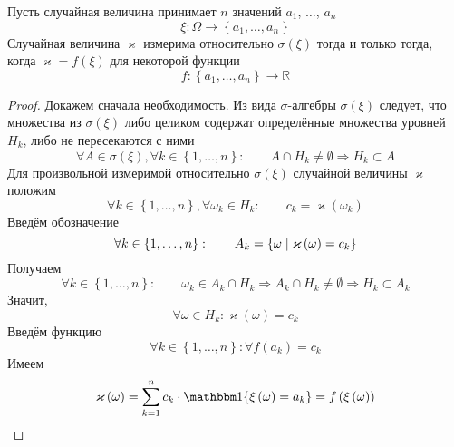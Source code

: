 \begin{affirmation}\label{measurableRandomVariable}
  Пусть случайная величина принимает $n$ значений $a_1$, $\dots$, $a_n$
  \begin{equation*}
    \xi: \Omega \rightarrow \left\{ a_1, \dots, a_n \right\}
  \end{equation*}
  Случайная величина $\varkappa$ измерима относительно
  $\sigma\left( \xi \right)$ тогда и только тогда, когда
  $\varkappa = f\left( \xi \right)$ для некоторой функции
  \begin{equation*}
    f: \left\{ a_1, \dots, a_n \right\} \rightarrow \mathbb{R}
  \end{equation*}
\end{affirmation}
\begin{proof}
  Докажем сначала необходимость.
  Из вида $\sigma$-алгебры $\sigma\left( \xi \right)$ следует, что множества
  из $\sigma\left( \xi \right)$ либо целиком содержат определённые множества
  уровней $H_k$, либо не пересекаются с ними
  \begin{equation*}
    \forall A \in \sigma\left( \xi \right),
    \forall k \in \left\{ 1, \dots, n \right\}: \qquad
    A \cap H_k \neq \emptyset \Rightarrow H_k \subset A
  \end{equation*}
  Для произвольной измеримой относительно $\sigma\left( \xi \right)$ случайной
  величины $\varkappa$ положим
  \begin{equation*}
    \forall k \in \left\{ 1, \dots, n \right\},
    \forall \omega_k \in H_k:\qquad
    c_k = \varkappa\left( \omega_k \right)
  \end{equation*}
  Введём обозначение
  \begin{equation*}
    \forall k \in \left\{ 1, \dots, n \right\}:\qquad
    A_k = \left\{ \omega \;\middle|\; \varkappa\left( \omega \right) = c_k \right\}
  \end{equation*}
  Получаем
  \begin{equation*}
    \forall k \in \left\{ 1, \dots, n \right\}:\qquad
    \omega_k \in A_k \cap H_k
    \Rightarrow A_k \cap H_k \neq \emptyset
    \Rightarrow H_k \subset A_k
  \end{equation*}
  Значит,
  \begin{equation*}
    \forall \omega \in H_k: \varkappa\left( \omega \right) = c_k
  \end{equation*}
  Введём функцию
  \begin{equation*}
    \forall k \in \left\{ 1, \dots, n \right\}:\forall
    f\left( a_k \right) = c_k
  \end{equation*}
  Имеем
  \begin{equation*}
    \varkappa\left( \omega \right)
    = \sum_{k=1}^{n} c_k \cdot \Indicator{\xi\left( \omega \right) = a_k}
    = f\left( \xi\left( \omega \right) \right)
  \end{equation*}


\end{proof}
